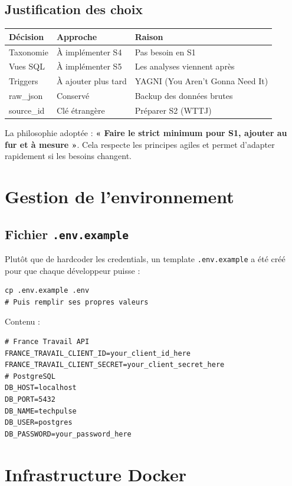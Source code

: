 \documentclass[12pt, a4paper]{article}
\begin{document}
\subsection{Justification des choix}
\begin{center}
\begin{tabular}{>{\ttfamily}p{3cm} p{2.5cm} p{6cm}}
\toprule
\textbf{Décision} & \textbf{Approche} & \textbf{Raison} \\
\midrule
Taxonomie & À implémenter S4 & Pas besoin en S1 \\
Vues SQL & À implémenter S5 & Les analyses viennent après \\
Triggers & À ajouter plus tard & YAGNI (You Aren't Gonna Need It) \\
raw\_json & Conservé & Backup des données brutes \\
source\_id & Clé étrangère & Préparer S2 (WTTJ) \\
\bottomrule
\end{tabular}
\end{center}
\vspace{0.3cm}
La philosophie adoptée : \textbf{« Faire le strict minimum pour S1, ajouter au fur et à mesure »}. Cela respecte les principes agiles et permet d'adapter rapidement si les besoins changent.
\section{Gestion de l'environnement}
\subsection{Fichier \texttt{.env.example}}
Plutôt que de hardcoder les credentials, un template \texttt{.env.example} a été créé pour que chaque développeur puisse :
\begin{lstlisting}[style=bash]
cp .env.example .env
# Puis remplir ses propres valeurs
\end{lstlisting}
Contenu :
\begin{lstlisting}[style=bash]
# France Travail API
FRANCE_TRAVAIL_CLIENT_ID=your_client_id_here
FRANCE_TRAVAIL_CLIENT_SECRET=your_client_secret_here
# PostgreSQL
DB_HOST=localhost
DB_PORT=5432
DB_NAME=techpulse
DB_USER=postgres
DB_PASSWORD=your_password_here
\end{lstlisting}
\section{Infrastructure Docker}
\end{document}
